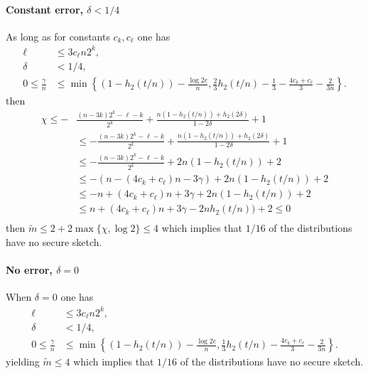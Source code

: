 \paragraph{Constant error, $\delta<1/4$} 
As long as for constants $c_k, c_\ell$ one has
\begin{align*}
\ell&\le 3c_\ell n2^k,\\
\delta &< 1/4,\\
0\le\frac{\gamma}{n} &\le \min\left\{(1-h_2(t/n)) - \frac{\log{2e}}{n}, \frac{2}{3}h_2(t/n)-\frac{1}{3}-\frac{4c_k+c_\ell}{3}-\frac{2}{3n}\right\}.
\end{align*} then 
\begin{align*}
\chi\le-&\frac{(n-3k)2^k-\ell-k}{2^k} + \frac{n(1-h_2(t/n)) +h_2(2\delta)}{1-2\delta}+1\\
&\le -\frac{(n-3k)2^k-\ell-k}{2^k} + \frac{n(1-h_2(t/n)) +h_2(2\delta)}{1-2\delta}+1 \\
&\le -\frac{(n-3k)2^k-\ell-k}{2^k} + 2n(1-h_2(t/n)) +2\\
 &\le -(n-(4c_k+c_\ell)n - 3\gamma) + 2n(1-h_2(t/n)) +2\\
&\le -n+(4c_k+c_\ell)n+3\gamma + 2n(1-h_2(t/n))+2 \\\
&\le n+(4c_k+c_\ell)n+3\gamma -2nh_2(t/n))+2 \le 0\\
\end{align*}
then $\tilde{m} \le 2+2\max\{\chi, \log{2}\} \le 4$ which implies that $1/16$ of the distributions have no secure sketch.

\paragraph{No error, $\delta=0$}
When $\delta = 0$ one has
\begin{align*}
\ell&\le 3c_\ell n2^k,\\
\delta &< 1/4,\\
0\le\frac{\gamma}{n} &\le \min\left\{(1-h_2(t/n)) - \frac{\log{2e}}{n}, \frac{1}{3}h_2(t/n)-\frac{4c_k+c_\ell}{3}-\frac{2}{3n}\right\}.
\end{align*} 
yielding $\tilde{m}\le 4$ which implies that $1/16$ of the distributions have no secure sketch.




